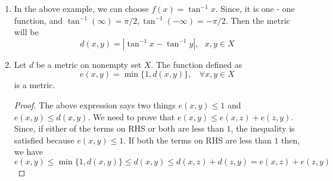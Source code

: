 \documentclass[12pt]{report}
\theoremstyle{definition}
\begin{document}
\begin{enumerate}
$$\begin{cases}
        -1 & \text{if } x = -\infty
    \end{cases}
    $$
    We define metric using $f$ as 
    $$ d(x,y) = |f(x) - f(y)|, ~~ x,y \in X$$
    \begin{proof}
        For injectivity, if $f(x) = f(y)$, we need to prove that $x = y$. Notice that $xy > 0$ is the only possible case. Since, $xy < 0$ ($x$ and $y$ are of opposite sign) is not possible because then $f(x) \neq f(y)$.
        \begin{align*}
            \frac{x}{1 + |x|} &= \frac{y}{1+|y|}\\
            x + x|y| &= y + y|x|\\
            x &= y~~~~\text{$\because$ xy $>$ 0}
        \end{align*}
        Hence, $f$ is one - one function. The metric $d$ is positive, $d(x,y) = d(y,x)$ $d = 0 \implies f(x) = f(y) \implies x = y$ ($\because f$ is one-one). On the other hand, if $x = y$ then it is obvious that $f(x) = f(y) \implies d = 0$. \\
        For triangle inequality, we can write
        \begin{align*}
            \left|\frac{x}{1+|x|} - \frac{1}{1+|y|}\right| &= \left|\frac{x}{1+|x|} - \frac{z}{1+|z|} + \frac{z}{1+|z|} - \frac{y}{1+|y|}\right| \\
            &= \left| \left(\frac{x}{1+|x|} - \frac{z}{1+|z|}\right) + \left(\frac{z}{1+|z|} - \frac{y}{1+|y|}\right)\right|\\
            &\leq \left|\frac{x}{1+|x|} - \frac{z}{1+|z|}\right| + \left|\frac{z}{1+|z|} - \frac{y}{1+|y|}\right|\\
            &\leq d(x,z) + d(z,y)
        \end{align*}
        Hence, it is a metric.
    \end{proof}
    \item In the above example, we can choose $f(x) = \tan^{-1} x$. Since, it is one - one function, and $\tan^{-1} (\infty) = \pi/2, \tan^{-1} (-\infty) = -\pi/2$. Then the metric will be
    $$ d(x, y) = |\tan^{-1} x - \tan^{-1} y|,~~~x,y \in X$$
    \item Let $d$ be a metric on nonempty set $X$. The function defined as 
    $$ e(x,y) = \min\{1, d(x,y)\},~~~~\forall x,y \in X$$ 
    is a metric.
    \begin{proof}
        The above expression says two things $e(x,y) \leq 1$ and $e(x,y) \leq d(x,y)$. We need to prove that $e(x,y) \leq e(x,z) + e(z,y)$. Since, if either of the terms on RHS or both are less than $1$, the inequality is satisfied because $e(x,y) \leq 1$. If both the terms on RHS are less than $1$ then, we have 
        $$ e(x,y) \leq \min\{1, d(x,y)\} \leq d(x,y) \leq d(x, z) + d(z,y) = e(x,z) + e(z,y)$$
    \end{proof}
\end{enumerate}
\end{document}
